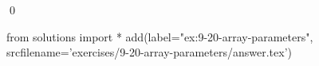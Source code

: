
\begin{ex}
  \label{ex:9-20-array-parameters}
  
  \qed
\end{ex}
\begin{python0}
from solutions import *
add(label="ex:9-20-array-parameters",
    srcfilename='exercises/9-20-array-parameters/answer.tex')
\end{python0}
